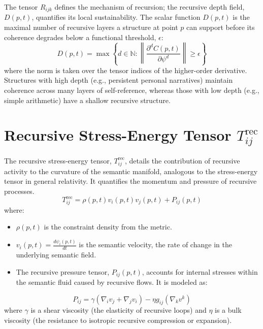 The tensor \(R_{ijk}\) defines the mechanism of recursion; the recursive depth field, \(D(p, t)\), quantifies its local sustainability. The scalar function \(D(p,t)\) is the maximal number of recursive layers a structure at point \(p\) can support before its coherence degrades below a functional threshold, \(\epsilon\):
\begin{equation}
D(p, t) = \max \left\{ d \in \mathbb{N} : \left\| \frac{\partial^d C(p,t)}{\partial \psi^d} \right\| \geq \epsilon \right\}
\end{equation}
where the norm is taken over the tensor indices of the higher-order derivative. Structures with high depth (e.g., persistent personal narratives) maintain coherence across many layers of self-reference, whereas those with low depth (e.g., simple arithmetic) have a shallow recursive structure.

\section{\texorpdfstring{Recursive Stress-Energy Tensor $T_{ij}^{\text{rec}}$}{Recursive Stress-Energy Tensor Tij\_rec}}

The recursive stress-energy tensor, \(T_{ij}^{\text{rec}}\), details the contribution of recursive activity to the curvature of the semantic manifold, analogous to the stress-energy tensor in general relativity. It quantifies the momentum and pressure of recursive processes.
\begin{equation}
T_{ij}^{\text{rec}} = \rho(p,t) v_i(p,t) v_j(p,t) + P_{ij}(p,t)
\end{equation}
where:
\begin{itemize}
    \item \(\rho(p,t)\) is the constraint density from the metric.
    \item \(v_i(p,t) = \frac{d\psi_i(p,t)}{dt}\) is the semantic velocity, the rate of change in the underlying semantic field.
    \item The recursive pressure tensor, \(P_{ij}(p,t)\), accounts for internal stresses within the semantic fluid caused by recursive flows. It is modeled as:
\end{itemize}
\begin{equation}
P_{ij} = \gamma(\nabla_i v_j + \nabla_j v_i) - \eta g_{ij} (\nabla_k v^k)
\end{equation}
where \(\gamma\) is a shear viscosity (the elasticity of recursive loops) and \(\eta\) is a bulk viscosity (the resistance to isotropic recursive compression or expansion).